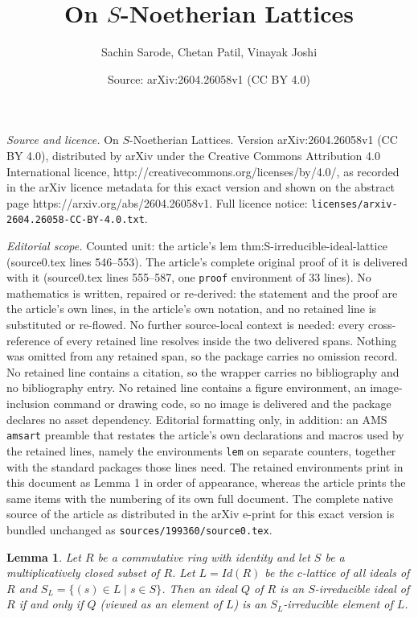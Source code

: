 \documentclass[10pt,a4paper]{amsart}
\title{On $S$-Noetherian Lattices}
\author{Sachin Sarode, Chetan Patil, Vinayak Joshi}
\date{Source: arXiv:2604.26058v1 (CC BY 4.0)}
\newtheorem{lem}{Lemma}
\begin{document}
\maketitle

\noindent\emph{Source and licence.} On $S$-Noetherian Lattices. Version arXiv:2604.26058v1 (CC BY 4.0), distributed by arXiv under the Creative Commons Attribution 4.0 International licence, http://creativecommons.org/licenses/by/4.0/, as recorded in the arXiv licence metadata for this exact version and shown on the abstract page https://arxiv.org/abs/2604.26058v1. Full licence notice: \texttt{licenses/arxiv-2604.26058-CC-BY-4.0.txt}.\par\smallskip

\noindent\textit{Editorial scope.} Counted unit: the article's lem thm:S-irreducible-ideal-lattice (source0.tex lines 546--553). The article's complete original proof of it is delivered with it (source0.tex lines 555--587, one \texttt{proof} environment of 33 lines). No mathematics is written, repaired or re-derived: the statement and the proof are the article's own lines, in the article's own notation, and no retained line is substituted or re-flowed.  No further source-local context is needed: every cross-reference of every retained line resolves inside the two delivered spans.  Nothing was omitted from any retained span, so the package carries no omission record.  No retained line contains a citation, so the wrapper carries no bibliography and no bibliography entry.  No retained line contains a figure environment, an image-inclusion command or drawing code, so no image is delivered and the package declares no asset dependency.  Editorial formatting only, in addition: an AMS \texttt{amsart} preamble that restates the article's own declarations and macros used by the retained lines, namely the environments \texttt{lem} on separate counters, together with the standard packages those lines need.  The retained environments print in this document as Lemma 1 in order of appearance, whereas the article prints the same items with the numbering of its own full document.  The complete native source of the article as distributed in the arXiv e-print for this exact version is bundled unchanged as \texttt{sources/199360/source0.tex}.
\begin{lem}\label{thm:S-irreducible-ideal-lattice}
	Let $R$ be a commutative ring with identity and let $S$ be a multiplicatively
	closed subset of $R$.
	Let $L=Id(R)$ be the $c$-lattice of all ideals of $R$ and
	$S_L=\{(s)\in L \mid s\in S\}$.
	Then an ideal $Q$ of $R$ is an $S$-irreducible ideal of $R$ if and only if
	$Q$ (viewed as an element of $L$) is an $S_L$-irreducible element of $L$.
\end{lem}
\end{document}
